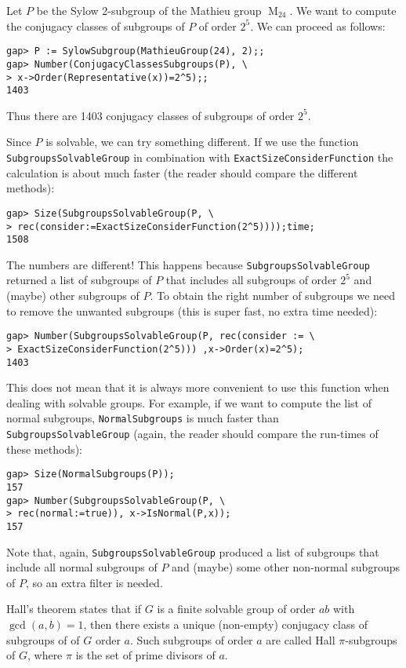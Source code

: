 \begin{example}
    Let $P$ be the Sylow 2-subgroup of the Mathieu group $\operatorname{M}_{24}$.
    We want to compute the conjugacy classes of subgroups of $P$ of order $2^5$. We can
    proceed as follows:
\begin{lstlisting}
gap> P := SylowSubgroup(MathieuGroup(24), 2);;
gap> Number(ConjugacyClassesSubgroups(P), \ 
> x->Order(Representative(x))=2^5);;
1403
\end{lstlisting}
Thus there are 1403 conjugacy classes of subgroups of order $2^5$. 

Since $P$ is solvable, we can
try something different. If we use the function 
\lstinline{SubgroupsSolvableGroup} in combination
with \lstinline{ExactSizeConsiderFunction} the calculation
is about much faster (the reader should compare the different methods): 
\begin{lstlisting}
gap> Size(SubgroupsSolvableGroup(P, \ 
> rec(consider:=ExactSizeConsiderFunction(2^5))));time;
1508
\end{lstlisting}
The numbers are different! This happens because \lstinline{SubgroupsSolvableGroup} 
returned a list of subgroups of $P$ 
that includes all subgroups of order $2^5$ and (maybe)
other subgroups of $P$. To obtain the right 
number of subgroups we need to 
remove the unwanted subgroups (this is super fast, no extra time needed): 
\begin{lstlisting}
gap> Number(SubgroupsSolvableGroup(P, rec(consider := \ 
> ExactSizeConsiderFunction(2^5))) ,x->Order(x)=2^5);
1403
\end{lstlisting}

This does not mean that it is always more convenient to use
this function when dealing with solvable groups. For example, 
if we want to compute the list of normal subgroups, 
\lstinline{NormalSubgroups} is much 
faster than \lstinline{SubgroupsSolvableGroup} (again, the reader 
should compare the run-times of these methods): 
\begin{lstlisting}
gap> Size(NormalSubgroups(P));
157
gap> Number(SubgroupsSolvableGroup(P, \ 
> rec(normal:=true)), x->IsNormal(P,x));
157
\end{lstlisting}
Note that, again, \lstinline{SubgroupsSolvableGroup} produced a list
of subgroups that include all normal subgroups of $P$ and (maybe)
some other non-normal subgroups of $P$, so an extra filter is needed. 
\end{example}

Hall's theorem states that if $G$ is a finite solvable group of order $ab$ with
$\gcd(a,b)=1$, then there exists a unique (non-empty) conjugacy class of subgroups of 
of $G$ order $a$.  
Such subgroups of order $a$ are
called Hall $\pi$-subgroups of $G$, 
where $\pi$ is the set of prime divisors of $a$. 


